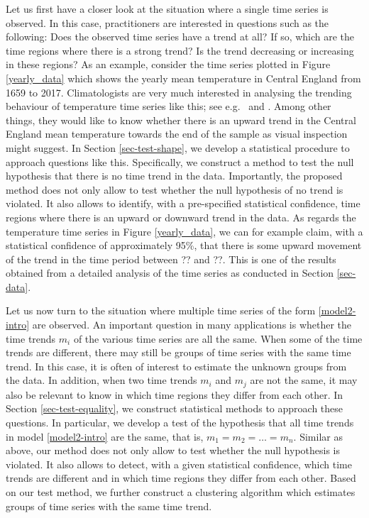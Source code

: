 Let us first have a closer look at the situation where a single time series is observed. In this case, practitioners are interested in questions such as the following: Does the observed time series have a trend at all? If so, which are the time regions where there is a strong trend? Is the trend decreasing or increasing in these regions? As an example, consider the time series plotted in Figure \ref{yearly_data} which shows the yearly mean temperature in Central England from 1659 to 2017. Climatologists are very much interested in analysing the trending behaviour of temperature time series like this; see e.g.\ \cite{Benner1999} and \cite{Rahmstorf2017}. Among other things, they would like to know whether there is an upward trend in the Central England mean temperature towards the end of the sample as visual inspection might suggest. In Section \ref{sec-test-shape}, we develop a statistical procedure to approach questions like this. Specifically, we construct a method to test the null hypothesis that there is no time trend in the data. Importantly, the proposed method does not only allow to test whether the null hypothesis of no trend is violated. It also allows to identify, with a pre-specified statistical confidence, time regions where there is an upward or downward trend in the data. As regards the temperature time series in Figure \ref{yearly_data}, we can for example claim, with a statistical confidence of approximately 95\%, that there is some upward movement of the trend in the time period between ?? and ??. This is one of the results obtained from a detailed analysis of the time series as conducted in Section \ref{sec-data}. 


Let us now turn to the situation where multiple time series of the form \eqref{model2-intro} are observed. An important question in many applications is whether the time trends $m_i$ of the various time series are all the same. When some of the time trends are different, there may still be groups of time series with the same time trend. In this case, it is often of interest to estimate the unknown groups from the data. In addition, when two time trends $m_i$ and $m_j$ are not the same, it may also be relevant to know in which time regions they differ from each other. In Section \ref{sec-test-equality}, we construct statistical methods to approach these questions. In particular, we develop a test of the hypothesis that all time trends in model \eqref{model2-intro} are the same, that is, $m_1 = m_2 = \ldots = m_n$. Similar as above, our method does not only allow to test whether the null hypothesis is violated. It also allows to detect, with a given statistical confidence, which time trends are different and in which time regions they differ from each other. Based on our test method, we further construct a clustering algorithm which estimates groups of time series with the same time trend.


